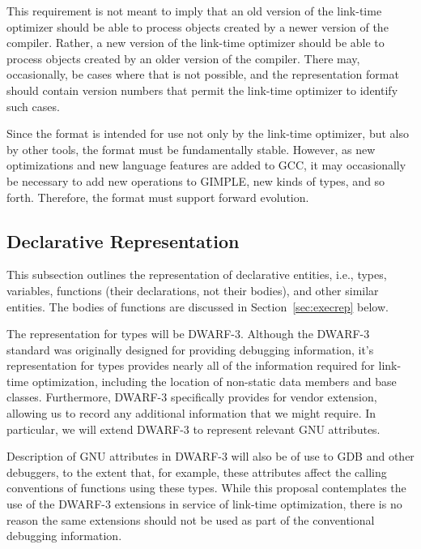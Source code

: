 \begin{note}
  This requirement is not meant to imply that an old version of the
  link-time optimizer should be able to process objects created by a
  newer version of the compiler.  Rather, a new version of the
  link-time optimizer should be able to process objects created by an
  older version of the compiler.  There may, occasionally, be cases
  where that is not possible, and the representation format should
  contain version numbers that permit the link-time optimizer to
  identify such cases.
\end{note}

\begin{rationale}
  Since the format is intended for use not only by the link-time
  optimizer, but also by other tools, the format must be fundamentally
  stable.  However, as new optimizations and new language features are
  added to GCC, it may occasionally be necessary to add new operations
  to GIMPLE, new kinds of types, and so forth.  Therefore, the format
  must support forward evolution.
\end{rationale}

\subsection{Declarative Representation}

This subsection outlines the representation of declarative entities,
i.e., types, variables, functions (their declarations, not their
bodies), and other similar entities.  The bodies of functions are
discussed in Section~\ref{sec:execrep} below.

The representation for types will be DWARF-3.  Although the DWARF-3
standard was originally designed for providing debugging information,
it's representation for types provides nearly all of the information
required for link-time optimization, including the location of
non-static data members and base classes.  Furthermore, DWARF-3
specifically provides for vendor extension, allowing us to record any
additional information that we might require.  In particular, we will
extend DWARF-3 to represent relevant GNU attributes.  

\begin{note}
Description of GNU attributes in DWARF-3 will also be of use to GDB
and other debuggers, to the extent that, for example, these attributes
affect the calling conventions of functions using these types.  While
this proposal contemplates the use of the DWARF-3 extensions in
service of link-time optimization, there is no reason the same
extensions should not be used as part of the conventional debugging
information.
\end{note}

